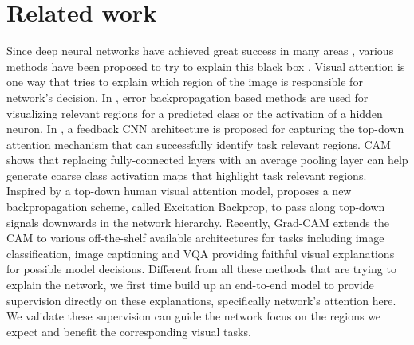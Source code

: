 \documentclass[10pt,twocolumn,letterpaper]{article}
\begin{document}
%
%
%
%
%



\section{Related work}\label{sc:related_work}

Since deep neural networks have achieved great success in many areas \cite{gong2017learning,zhang2017image}, various methods have been proposed to try to explain this black box \cite{simonyan2013deep,zeiler2014visualizing,cao2015look,zhou2014object,zhang2017mdnet}. Visual attention is one way that tries to explain which region of the image is responsible for network's decision. In \cite{simonyan2013deep,zeiler2014visualizing,springenberg2015striving}, error backpropagation based methods are used for visualizing relevant regions for a predicted class or the activation of a hidden neuron. In \cite{cao2015look}, a feedback CNN architecture is proposed for capturing the top-down attention mechanism that can successfully identify task relevant regions. CAM \cite{zhou2016learning} shows that replacing fully-connected layers with an average pooling layer can help generate coarse class activation maps that highlight task relevant regions. Inspired by a top-down human visual attention model, \cite{zhang2016top} proposes a new backpropagation scheme, called Excitation Backprop, to pass along top-down signals downwards in the network hierarchy. Recently, Grad-CAM \cite{grad-cam} extends the CAM to various off-the-shelf available architectures for tasks including image classification, image captioning and VQA providing faithful visual explanations for possible model decisions. Different from all these methods that are trying to explain the network, we first time build up an end-to-end model to provide supervision directly on these explanations, specifically network's attention here. We validate these supervision can guide the network focus on the regions we expect and benefit the corresponding visual tasks.  
\end{document}
